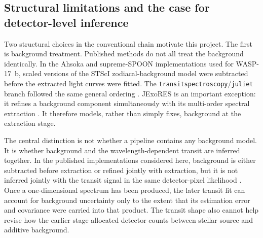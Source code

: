 \subsection{Structural limitations and the case for detector-level inference}
\label{sec:structural-limitations-inference}
\label{sec:structural-limitations}
\label{sec:benchmark-and-nova}


Two structural choices in the conventional chain motivate this project. The
first is background treatment. Published methods do not all treat the
background identically. In the Ahsoka and supreme-SPOON implementations used
for WASP-17~b, scaled versions of the STScI zodiacal-background model were
subtracted before the extracted light curves were fitted. The
\texttt{transitspectroscopy}/\texttt{juliet} branch followed the same general
ordering \citep{LouieEtAl2025}. JExoRES is an important exception: it refines a
background component simultaneously with its multi-order spectral extraction
\citep{HolmbergMadhusudhan2023}. It therefore models, rather than simply fixes,
background at the extraction stage.

The central distinction is not whether a pipeline contains any background
model. It is whether background and the wavelength-dependent transit are
inferred together. In the published implementations considered here,
background is either subtracted before extraction or refined jointly with
extraction, but it is not inferred jointly with the transit signal in the same
detector-pixel likelihood
\citep{HolmbergMadhusudhan2023,LouieEtAl2025}. Once a one-dimensional spectrum has been produced,
the later transit fit can account for background uncertainty only to the extent
that its estimation error and covariance were carried into that product. The
transit shape also cannot help revise how the earlier stage allocated detector
counts between stellar source and additive background.

